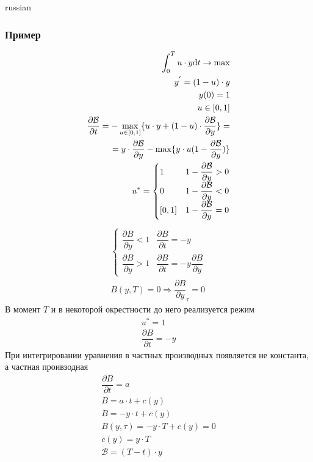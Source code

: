 \documentclass{article}
\begin{document}
\begin{otherlanguage*}{russian}
\begin{enumerate}
\begin{itemize}
\subsubsection*{Пример}
\begin{align*}
\int_0^T u \cdot y \text d t \rightarrow \max \\
y^{'} = (1 - u) \cdot y \\
y(0) = 1 \\
u \in [0, 1] \\
\dfrac{\partial \mathcal{B}}{\partial t} = - \max_{u \in [0, 1]} \{ u \cdot y + (1 - u) \cdot \dfrac{\partial \mathcal{B}}{\partial y}\} =\\
=  y \cdot \dfrac{\partial \mathcal{B}}{\partial y} - \max \{ y \cdot u (1 - \dfrac{\partial \mathcal{B}}{\partial y} ) \} \\
u^* = \begin{cases}
1 & 1 - \dfrac{\partial \mathcal{B}}{\partial y} > 0 \\
0 & 1 - \dfrac{\partial \mathcal{B}}{\partial y} < 0 \\
[0, 1] & 1 - \dfrac{\partial \mathcal{B}}{\partial y } = 0 
\end{cases} 
\end{align*} 
\begin{align*}
\begin{cases}
\dfrac{\partial B}{\partial y} < 1 & \dfrac{\partial B}{\partial t} = - y \\
\dfrac{\partial B}{\partial y} > 1 & 
\dfrac{\partial B}{\partial t} = - y \dfrac{\partial B}{\partial y}
\end{cases} \\
B(y, T) = 0 \Rightarrow \dfrac{\partial B}{\partial y}_\tau = 0 
\end{align*}
В момент $ T $ и в некоторой окрестности до него реализуется режим 
\begin{align*}
u^* = 1 \\
\dfrac{\partial B}{\partial t} = - y 
\end{align*}
При интегрировании уравнения в частных производных появляется не константа, а частная проивзодная
\begin{align*}
\dfrac{\partial B}{\partial t} = a \\
B = a \cdot t + c(y) \\
B = - y \cdot t  + c(y) \\
B(y, \tau) = - y \cdot T + c(y) = 0 \\
c(y) = y \cdot  T \\
\mathcal{B} = (T - t) \cdot y 

\end{align*}
\end{itemize}
\end{enumerate}
\end{otherlanguage*}
\end{document}
